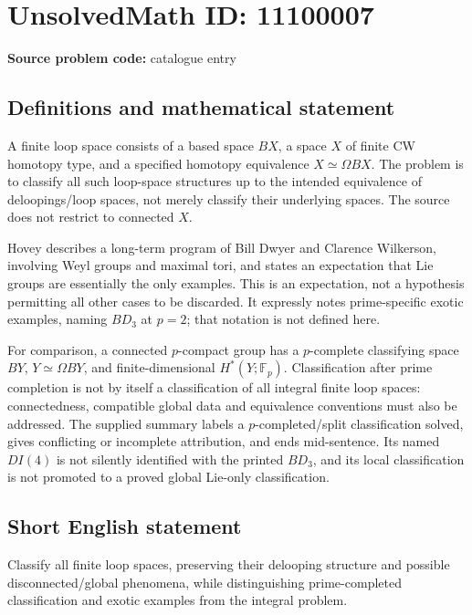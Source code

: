 \documentclass[11pt]{article}
\newcommand{\F}{\mathbb{F}}
\begin{document}
\section*{UnsolvedMath ID: 11100007}
\textbf{Source problem code:} catalogue entry
\subsection{Definitions and mathematical statement}
A finite loop space consists of a based space \(BX\), a space \(X\) of finite CW homotopy type, and a specified homotopy equivalence \(X\simeq\Omega BX\). The problem is to classify all such loop-space structures up to the intended equivalence of deloopings/loop spaces, not merely classify their underlying spaces. The source does not restrict to connected \(X\).

Hovey describes a long-term program of Bill Dwyer and Clarence Wilkerson, involving Weyl groups and maximal tori, and states an expectation that Lie groups are essentially the only examples. This is an expectation, not a hypothesis permitting all other cases to be discarded. It expressly notes prime-specific exotic examples, naming \(BD_3\) at \(p=2\); that notation is not defined here.

For comparison, a connected \(p\)-compact group has a \(p\)-complete classifying space \(BY\), \(Y\simeq\Omega BY\), and finite-dimensional \(H^*(Y;\F_p)\). Classification after prime completion is not by itself a classification of all integral finite loop spaces: connectedness, compatible global data and equivalence conventions must also be addressed. The supplied summary labels a \(p\)-completed/split classification solved, gives conflicting or incomplete attribution, and ends mid-sentence. Its named \(DI(4)\) is not silently identified with the printed \(BD_3\), and its local classification is not promoted to a proved global Lie-only classification.
\subsection{Short English statement}
Classify all finite loop spaces, preserving their delooping structure and possible disconnected/global phenomena, while distinguishing prime-completed classification and exotic examples from the integral problem.
\end{document}
